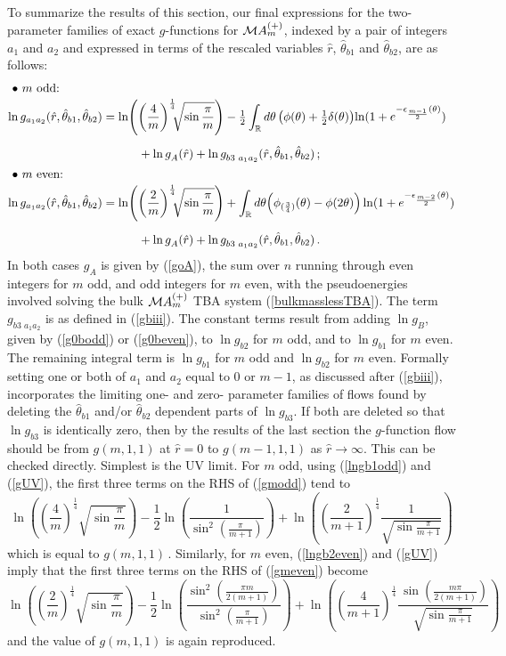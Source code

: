 \documentclass[11pt]{article}
\newcommand\RR{{\mathbb R}}
\newcommand\phup{^{\phantom o}}
\newcommand{\CM}{{\cal M}}
\newcommand\beq{\begin{equation}}
\newcommand\eeq{\end{equation}}
\newcommand\nn{\nonumber}
\newcommand\half{{\textstyle\frac{1}{2}}}
\newcommand{\te}{\theta}
\newcommand{\htbi}{\hat\theta_{b1}}
\newcommand{\htbii}{\hat\theta_{b2}}
\newcommand{\goA}{g\phup_{A}}
\newcommand{\goB}{g\phup_{B}}
\newcommand{\gi}{g\phup_{b1}}
\newcommand{\gii}{g\phup_{b2}}
\newcommand{\giii}{g\phup_{b3}}
\begin{document}
To summarize the results of this section, our final expressions 
for the two-parameter families of exact 
$g$-functions for $\CM A^{(+)}_m$, indexed by a pair of integers $a_1$
and $a_2$ and expressed in terms of
the rescaled variables $\hat r$, $\htbi$ and 
$\htbii$, are as follows:
\vskip -25pt
%
\begin{align}
\intertext{ $\bullet$ $m$ odd:}
\ln g_{a_1a_2}(\hat{r},\htbi,\htbii) &=
\ln\!\left(\left(\frac{4}{m}\right)^{\frac{1}{4}}\!\!\!
\sqrt{\sin\frac{\pi}{m}}\right)-\half\int_{\RR}{d\te\left(\phi(\te)+
\half\delta(\theta)\right)\!\ln(1+e^{-\epsilon_{\frac{m-1}{2}}(\te)})}
\nn\\[5pt]
&\quad\qquad +\ln\goA(\hat{r})
+\ln g\phup_{b3\,\,a_1a_2}(\hat r,\htbi,\htbii)\,;
\label{gmodd}\\
\intertext{ $\bullet$ $m$ even:}
\ln g_{a_1a_2}(\hat{r},\htbi,\htbii) &=
\ln\!\left(\left(\frac{2}{m}\right)^{\frac{1}{4}}\!\!\!
\sqrt{\sin\frac{\pi}{m}}\right)+\int_{\RR}{d\te\Bigl(\phi_{(\frac{3}{4})}(\te)
- \phi(2\theta)\Bigr)\ln(1+e^{-\epsilon_{\frac{m-2}{2}}(\te)})}
\nn\\[5pt]
&\quad\qquad 
+\ln\goA(\hat{r})
+\ln g\phup_{b3\,\,a_1a_2}(\hat
r,\htbi,\htbii)\,.
\label{gmeven}
\end{align}
%
In both cases $\goA$ is given by (\ref{goA}), the
sum over $n$ running through even integers for $m$ odd, and 
odd integers for $m$ even, with the pseudoenergies involved
solving the bulk
$\CM A^{(+)}_m$ TBA system (\ref{bulkmasslessTBA}). The term
$g\phup_{b3\,\,a_1a_2}$ is as defined in (\ref{gbiii}). The
constant terms result from adding $\ln\goB$, given by
(\ref{g0bodd}) or (\ref{g0beven}), to $\ln\gii$ for $m$ odd, and to
$\ln\gi$ for $m$ even. The remaining integral term is $\ln\gi$
for $m$ odd and $\ln\gii$ for $m$ even. Formally setting one or both
of $a_1$ and $a_2$ equal to $0$ or $m{-}1$, as discussed after
(\ref{gbiii}), incorporates the
limiting one- and zero- parameter families
of flows found by deleting the $\htbi$ and/or
$\htbii$ dependent parts of $\ln\giii$. If both are
deleted so that $\ln\giii$ is identically zero, 
then by the results of the last section the
$g$-function flow should be from $g(m,1,1)$ at $\hat r=0$ to
$g(m{-}1,1,1)$ as $\hat r\to\infty$. This can be checked directly.
Simplest is the UV limit. For $m$ odd, 
using (\ref{lngb1odd})
and (\ref{gUV}),
the first three terms on the RHS of (\ref{gmodd}) tend to
\beq
\ln\left(\left(\frac{4}{m}\right)^{\frac{1}{4}}
\!\!\sqrt{\sin{\frac{\pi}{m}}}\right)
-\half\ln\left(\frac{1}{\sin^2\left(\frac{\pi}{m+1}\right)}\right)
+\ln\left(\left(\frac{2}{m+1}\right)^{\frac{1}{4}}
\frac{1}{\sqrt{\sin{\frac{\pi}{m+1}}}}\right)
\eeq
which is equal to $g(m,1,1)$\,.
Similarly, for $m$ even, (\ref{lngb2even}) and (\ref{gUV})
imply that the first three terms on the RHS of
(\ref{gmeven}) become
\beq
\ln\left(\left(\frac{2}{m}\right)^{\!\frac{1}{4}}\!\!
\sqrt{\sin{\frac{\pi}{m}}}\right)
-
\half\ln\left(\frac{\sin^2\left(\frac{\pi m}{2(m+1)}\right)}%
{\sin^2\left(\frac{\pi}{m+1}\right)}\right)
+
\ln\left(\left(\frac{4}{m{+}1}\right)^{\!\frac{1}{4}}
\frac{\,\sin\left(\frac{m\pi}{2(m+1)}\right)}%
{\sqrt{\sin{\frac{\pi}{m+1}}}}\right)
\eeq
\nobreak
and the value of $g(m,1,1)$ is again reproduced.
\goodbreak
\end{document}
